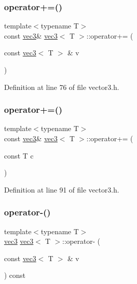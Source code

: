 \subsubsection{\texorpdfstring{operator+=()}{operator+=()}\hspace{0.1cm}{\footnotesize\ttfamily [1/2]}}
{\footnotesize\ttfamily template$<$typename T$>$ \\
const \mbox{\hyperlink{structvec3}{vec3}}\& \mbox{\hyperlink{structvec3}{vec3}}$<$ T $>$\+::operator+= (\begin{DoxyParamCaption}\item[{const \mbox{\hyperlink{structvec3}{vec3}}$<$ T $>$ \&}]{v }\end{DoxyParamCaption})\hspace{0.3cm}{\ttfamily [inline]}}



Definition at line 76 of file vector3.\+h.

\mbox{\label{structvec3_ad87cc5752847a9ad05adba9c3d881324}} 
\subsubsection{\texorpdfstring{operator+=()}{operator+=()}\hspace{0.1cm}{\footnotesize\ttfamily [2/2]}}
{\footnotesize\ttfamily template$<$typename T$>$ \\
const \mbox{\hyperlink{structvec3}{vec3}}\& \mbox{\hyperlink{structvec3}{vec3}}$<$ T $>$\+::operator+= (\begin{DoxyParamCaption}\item[{const T}]{c }\end{DoxyParamCaption})\hspace{0.3cm}{\ttfamily [inline]}}



Definition at line 91 of file vector3.\+h.

\mbox{\label{structvec3_a62ca43535073d9711fe179e26a412e32}} 
\subsubsection{\texorpdfstring{operator-\/()}{operator-()}\hspace{0.1cm}{\footnotesize\ttfamily [1/3]}}
{\footnotesize\ttfamily template$<$typename T$>$ \\
\mbox{\hyperlink{structvec3}{vec3}} \mbox{\hyperlink{structvec3}{vec3}}$<$ T $>$\+::operator-\/ (\begin{DoxyParamCaption}\item[{const \mbox{\hyperlink{structvec3}{vec3}}$<$ T $>$ \&}]{v }\end{DoxyParamCaption}) const\hspace{0.3cm}{\ttfamily [inline]}}



